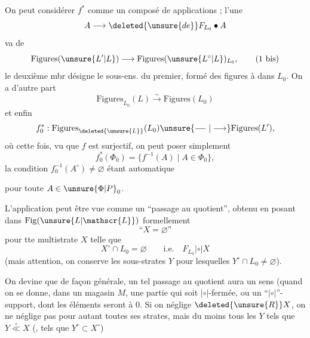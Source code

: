On peut considérer $f^*$ comme un composé de   applications ; l'une
\[
A\longrightarrow\deleted{\unsure{de}}F_{L_0}\bullet A
\]
va de
\[
\mathrm{Figures}(\unsure{L'|L})\longrightarrow\mathrm{Figures}(\unsure{L^\circ|L})_{L_0},\tag*{(1 bis)}
\]
le deuxième mbr désigne le sous-ens. du premier, formé des figures à  dans $L_0$. On a d'autre part
\[
\mathrm{Figures}_{L_0}(L)\xrightarrow{\sim}\mathrm{Figures}(L_0)\tag*{(1 ter)}
\]
et enfin
\[
f_0^*:\mathrm{Figures}_{\deleted{\unsure{L}}}(L_0)\unsure{\relbar\joinrel\relbar|\longrightarrow}\mathrm{Figures}(L'),
\]
où cette fois, vu que $f$ est surjectif, on peut poser simplement
\[
f_0^*(\Phi_0)=\{f^{-1}(A)\mid A\in\Phi_0\},\tag*{(2)}
\]
la condition $f_0^{-1}(A^\circ)\ne\varnothing$ étant automatique

pour toute $A\in\unsure{\Phi|P}_0$.

L'application  peut être vue comme un ``passage au quotient'', obtenu en posant dans $\mathrm{Fig}(\unsure{L|\mathscr{L}})$ formellement
\[
\text{``}X=\varnothing\text{''}
\]
pour tte multistrate $X$ telle que
\[
X^\circ\cap L_0=\varnothing\qquad\text{i.e.}\quad F_{L_0}\mathrel{|\circ|}X
\]
(mais attention, on conserve les sous-strates $Y$ pour lesquelles $Y^\circ\cap L_0\ne\varnothing$).

 On devine que de façon générale, un tel passage au quotient aura un sens (quand on se donne, dans un magasin $M$, une partie qui soit $|\circ|$-fermée, ou un ``$|\circ|$''-support, dont les éléments seront  à $0$. Si on néglige $\deleted{\unsure{R}}X$, on ne néglige pas pour autant toutes ses strates, mais du moins tous les $Y$ tels que $Y\mathrel{\overset{\circ}{\ll}}X$ (, tels que $Y^\circ\subset X^\circ$)


